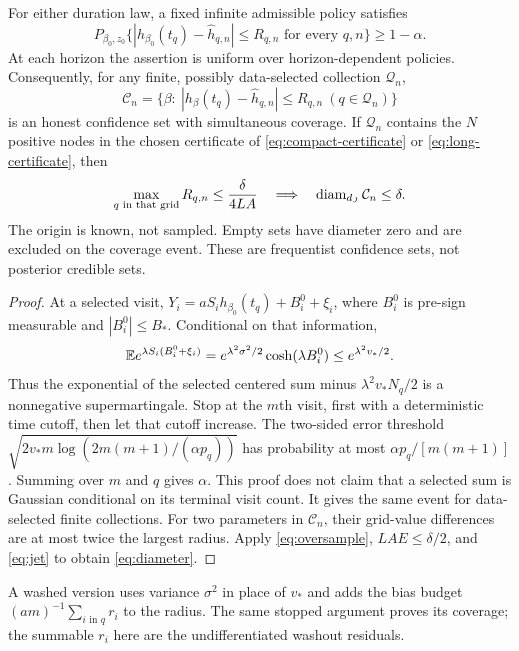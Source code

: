 \begin{theorem}
\label{thm:confidence}
For either duration law, a fixed infinite admissible policy satisfies
\[
 P_{\beta_0,z_0}\{|h_{\beta_0}(t_q)-\widehat h_{q,n}|\le R_{q,n}
                \text{ for every }q,n\}\ge1-\alpha.
\]
At each horizon the assertion is uniform over horizon-dependent policies.
Consequently, for any finite, possibly data-selected collection $\mathcal Q_n$,
\[
 \mathcal C_n=\{\beta:\ |h_\beta(t_q)-\widehat h_{q,n}|\le R_{q,n}
                                    \ (q\in\mathcal Q_n)\}
\]
is an honest confidence set with simultaneous coverage. If $\mathcal Q_n$
contains the $N$ positive nodes in the chosen certificate of
\eqref{eq:compact-certificate} or \eqref{eq:long-certificate}, then
\begin{equation}
 \max_{q\text{ in that grid}}R_{q,n}\le \frac{\delta}{4LA}
 \quad\Longrightarrow\quad \operatorname{diam}_{d_J}\mathcal C_n\le\delta.
 \label{eq:diameter}
\end{equation}
The origin is known, not sampled. Empty sets have diameter zero and are
excluded on the coverage event. These are frequentist confidence sets, not
posterior credible sets.
\end{theorem}
\begin{proof}
At a selected visit, $Y_i=aS_i h_{\beta_0}(t_q)+B_i^0+\xi_i$, where $B_i^0$
is pre-sign measurable and $|B_i^0|\le B_*$. Conditional on that information,
\[
 \mathbb E e^{\lambda S_i(B_i^0+\xi_i)}
 =e^{\lambda^2\sigma^2/2}\cosh(\lambda B_i^0)
 \le e^{\lambda^2v_*/2}.
\]
Thus the exponential of the selected centered sum minus
$\lambda^2v_*N_q/2$ is a nonnegative supermartingale. Stop at the $m$th visit,
first with a deterministic time cutoff, then let that cutoff increase.
The two-sided error threshold $\sqrt{2v_*m\log(2m(m+1)/(\alpha p_q))}$
has probability at most $\alpha p_q/[m(m+1)]$. Summing over $m$ and $q$ gives
$\alpha$. This proof does not claim that a selected sum is Gaussian conditional on
its terminal visit count. It gives the same event for data-selected
finite collections. For two parameters in $\mathcal C_n$, their grid-value
differences are at most twice the largest radius. Apply
\eqref{eq:oversample}, $LAE\le\delta/2$, and \eqref{eq:jet} to obtain
\eqref{eq:diameter}.
\end{proof}

A washed version uses variance $\sigma^2$ in place of $v_*$ and adds the
bias budget $(am)^{-1}\sum_{i\text{ in }q}r_i$ to the radius. The same stopped
argument proves its coverage; the summable $r_i$ here are the undifferentiated
washout residuals.

